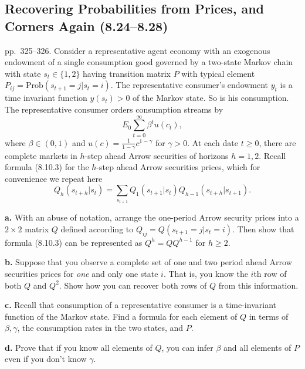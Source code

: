 \documentclass[12pt, letterpaper]{article}
\begin{document}
\subsection{Recovering Probabilities from Prices, and Corners Again (8.24--8.28)}

\begin{tcolorbox}[evenbox,title={Exercise 8.24 \quad Recovering probabilities from prices}]
\begin{tcolorbox}[questionbox]
pp.~325--326. Consider a representative agent economy with an exogenous endowment of a single
consumption good governed by a two-state Markov chain with state $s_t\in\{1,2\}$ having transition matrix
$P$ with typical element $P_{ij}=\mathrm{Prob}(s_{t+1}=j|s_t=i)$. The representative consumer's endowment
$y_t$ is a time invariant function $y(s_t)>0$ of the Markov state. So is his consumption. The representative
consumer orders consumption streams by
\[
E_0\sum_{t=0}^\infty\beta^tu(c_t),
\]
where $\beta\in(0,1)$ and $u(c)=\frac{1}{1-\gamma}c^{1-\gamma}$ for $\gamma>0$. At each date $t\ge0$, there are
complete markets in $h$-step ahead Arrow securities of horizons $h=1,2$. Recall formula (8.10.3) for the
$h$-step ahead Arrow securities prices, which for convenience we repeat here
\[
Q_h(s_{t+h}|s_t)=\sum_{s_{t+1}}Q_1(s_{t+1}|s_t)Q_{h-1}(s_{t+h}|s_{t+1}).
\]

\textbf{a.} With an abuse of notation, arrange the one-period Arrow security prices into a $2\times2$ matrix $Q$
defined according to $Q_{ij}=Q(s_{t+1}=j|s_t=i)$. Then show that formula (8.10.3) can be represented as
$Q^h=QQ^{h-1}$ for $h\ge2$.

\textbf{b.} Suppose that you observe a complete set of one and two period ahead Arrow securities prices for
\emph{one} and only one state $i$. That is, you know the $i$th row of both $Q$ and $Q^2$. Show how you can
recover both rows of $Q$ from this information.

\textbf{c.} Recall that consumption of a representative consumer is a time-invariant function of the Markov
state. Find a formula for each element of $Q$ in terms of $\beta,\gamma$, the consumption rates in the two
states, and $P$.

\textbf{d.} Prove that if you know all elements of $Q$, you can infer $\beta$ and all elements of $P$ even if you
don't know $\gamma$.
\end{tcolorbox}


\end{tcolorbox}
\end{document}
